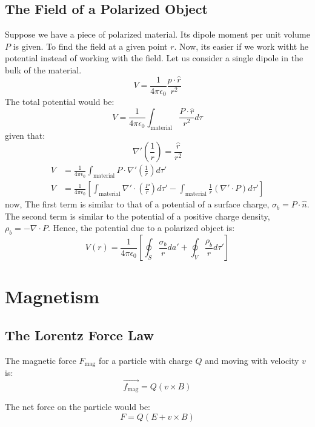 \documentclass{article}
\begin{document}
\subsection{The Field of a Polarized Object}
Suppose we have a piece of polarized material. Its dipole moment per unit volume $P$ is given.
To find the field at a given point $r$. Now, its easier if we work witht he potential instead of working with the field. Let us consider a single dipole in the bulk of the material.\\
\[ V = \frac{1}{4 \pi \epsilon_0} \frac{p \cdot \hat{r}}{r^2} \]
The total potential would be:
\[ V = \frac{1}{4 \pi \epsilon_0}  \int_{\text{material}} \frac{P \cdot \hat{r}}{r^2} d\tau \]
given that:
\[ \nabla' \left(\frac{1}{r}\right) = \frac{\hat{r}}{r^2} \]
\begin{align*}
	V & = \frac{1}{4 \pi \epsilon_0} \int_{\text{material}} P \cdot \nabla' \left(\frac{1}{r}\right) d\tau'                                                                                             \\
	V & = \frac{1}{4 \pi \epsilon_0} \left[ \int_{\text{material}} \nabla '\cdot \left( \frac{P}{r}\right) d\tau ' - \int_{\text{material}} \frac{1}{r} \left( \nabla ' \cdot P \right) d \tau' \right]
\end{align*}
now, The first term is similar to that of a potential of a surface charge, $\sigma_b = P \cdot \hat{n}$.
The second term is similar to the potential of a positive charge density, $\rho_b = - \nabla \cdot P$.
Hence, the potential due to a polarized object is:
\[ V(r) = \frac{1}{4 \pi \epsilon_0} \left[ \oint_{S} \frac{\sigma_b}{r} da' + \oint_{V} \frac{\rho_b}{r} d\tau ' \right] \]


\section{Magnetism}
\subsection{The Lorentz Force Law}
The magnetic force $F_{\text{mag}}$ for a particle with charge $Q$ and moving with velocity $v$ is:
\[ \vec{f_{\text{mag}}} = Q (v \times B) \]

The net force on the particle would be:
\[ F = Q (E + v \times B ) \]
\end{document}
